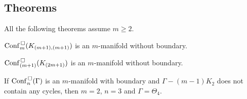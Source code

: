 \subsection{Theorems}
All the following theorems assume \(m \ge 2\).

\begin{prop}
\(\mathrm{Conf}^{\,\square}_m(K_{(m+1), (m+1)})\) is an \(m\)-manifold without boundary.
\end{prop}

\begin{prop}
\(\mathrm{Conf}^{\,\square}_{(m+1)}(K_{(2m+1)})\) is an \(m\)-manifold without boundary.
\end{prop}

\begin{prop}
If  \(\mathrm{Conf}^{\,\square}_n(\Gamma)\) is an \(m\)-manifold with boundary
and \(\Gamma - (m-1)K_2\) does not contain any cycles,
then \(m = 2\), \(n = 3\) and \(\Gamma = \Theta_4\).
\end{prop}
